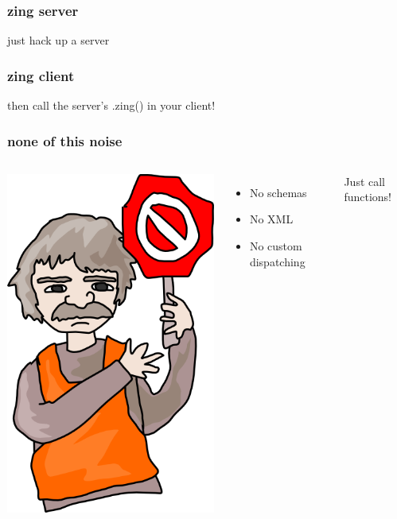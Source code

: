 \documentclass{beamer}
\begin{document}
\begin{frame}
    \frametitle{zing server}

    \huge
    just hack up a server
    \newline

    \normalsize
    \fbox{}
\end{frame}

\begin{frame}
    \frametitle{zing client}

    \huge
    then call the server's .zing() in your client!
    \newline

    \normalsize
    \fbox{
        
    }
\end{frame}

\begin{frame}
    \frametitle{none of this noise}
    
    \begin{columns}[c]
        \includegraphics[scale=0.4]{images/no.png}
        \huge
        \begin{itemize}
            \item No schemas
            \item No XML
            \item No custom dispatching
        \end{itemize}
        \pause
        Just call functions!
    \end{columns}
\end{frame}
\end{document}
